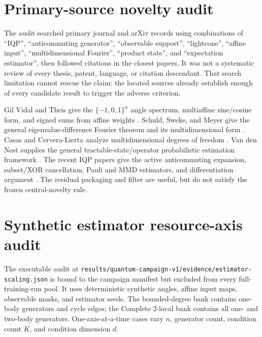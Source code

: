 \section{Primary-source novelty audit}
\label{app:prior}

The audit searched primary journal and arXiv records using combinations of
``IQP'', ``anticommuting generator'', ``observable support'', ``lightcone'',
``affine input'', ``multidimensional Fourier'', ``product state'', and
``expectation estimator'', then followed citations in the closest papers.  It
was not a systematic review of every thesis, patent, language, or citation
descendant.  That search limitation cannot rescue the claim: the located
sources already establish enough of every candidate result to trigger the
adverse criterion.

Gil Vidal and Theis give the $\{-1,0,1\}^n$ angle spectrum, multiaffine
sine/cosine form, and signed sums from affine weights
\cite{gilVidalInputRedundancy2020}. Schuld, Sweke, and Meyer give the general
eigenvalue-difference Fourier theorem and its multidimensional form
\cite{schuldEffectDataEncoding2021}. Casas and Cervera-Lierta analyze
multidimensional degrees of freedom \cite{casasMultidimensionalFourier2023}.
Van den Nest supplies the general tractable-state/operator probabilistic
estimation framework \cite{nestSimulatingQuantumComputers2011}.  The recent
IQP papers give the active anticommuting expansion, subset/XOR cancellation,
Pauli and MMD estimators, and differentiation argument
\cite{recio-armengolIQPoptFastOptimization2025,
recio-armengolTrainClassicalDeploy2026}.  The residual packaging and filter
are useful, but do not satisfy the frozen central-novelty rule.

\section{Synthetic estimator resource-axis audit}
\label{app:estimator-scaling}

The executable audit at
\texttt{results/quantum-campaign-v1/evidence/estimator-scaling.json} is bound
to the campaign manifest but excluded from every full-training-run pool.  It
uses deterministic synthetic angles, affine input maps, observable masks, and
estimator seeds.  The bounded-degree bank contains one-body generators and
cycle edges; the Complete 2-local bank contains all one- and two-body
generators.  One-axis-at-a-time cases vary $n$, generator count, condition
count $K$, and condition dimension $d$.


